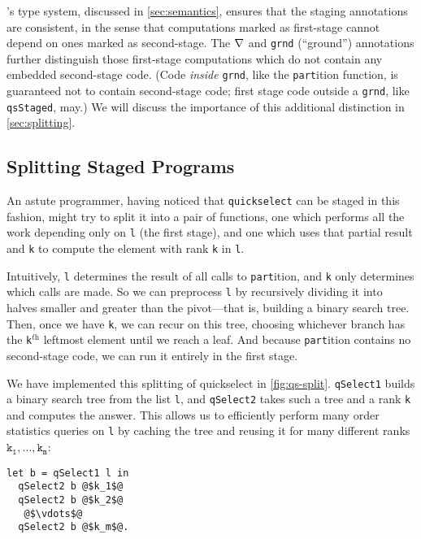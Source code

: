 \begin{abstrsyn}
\lang's type system, discussed in \ref{sec:semantics}, ensures that the staging
annotations are consistent, in the sense that computations marked as
first-stage cannot depend on ones marked as second-stage. The $\nabla$ and
\texttt{grnd} (``ground'') annotations further distinguish those first-stage computations
which do not contain any embedded second-stage code. (Code \emph{inside}
\texttt{grnd}, like the \texttt{part}ition function, is guaranteed not to
contain second-stage code; first stage code outside a \texttt{grnd}, 
like \texttt{qsStaged}, may.) We will
discuss the importance of this additional distinction in \ref{sec:splitting}.

\subsection{Splitting Staged Programs}



An astute programmer, having noticed that \texttt{quickselect} can be staged in
this fashion, might try to split it into a pair of functions, one which performs
all the work depending only on \texttt{l} (the first stage), and one which uses
that partial result and \texttt{k} to compute the element with
rank \texttt{k} in \texttt{l}. 

Intuitively, \texttt{l} determines the result of all calls to
\texttt{part}ition, and \texttt{k} only determines which calls are made. So we
can preprocess \texttt{l} by recursively dividing it into halves smaller and
greater than the pivot---that is, building a binary search tree. Then, once we
have \texttt{k}, we can recur on this tree, choosing whichever branch has the
\texttt{k}${}^\textit{th}$ leftmost element until we reach a leaf. And because
\texttt{part}ition contains no second-stage code, we can run it entirely in the
first stage.

We have implemented this splitting of quickselect in \ref{fig:qs-split}.
\texttt{qSelect1} builds a binary search tree from the list \texttt{l}, and
\texttt{qSelect2} takes such a tree and a rank \texttt{k} and computes the
answer. This allows us to efficiently perform many order statistics queries on
\texttt{l} by caching the tree and reusing it for many different ranks
$\mathtt{k_1},\dots,\mathtt{k_m}$:
%
\begin{lstlisting}
let b = qSelect1 l in
  qSelect2 b @$k_1$@
  qSelect2 b @$k_2$@
   @$\vdots$@ 
  qSelect2 b @$k_m$@.
\end{lstlisting}


\end{abstrsyn}
